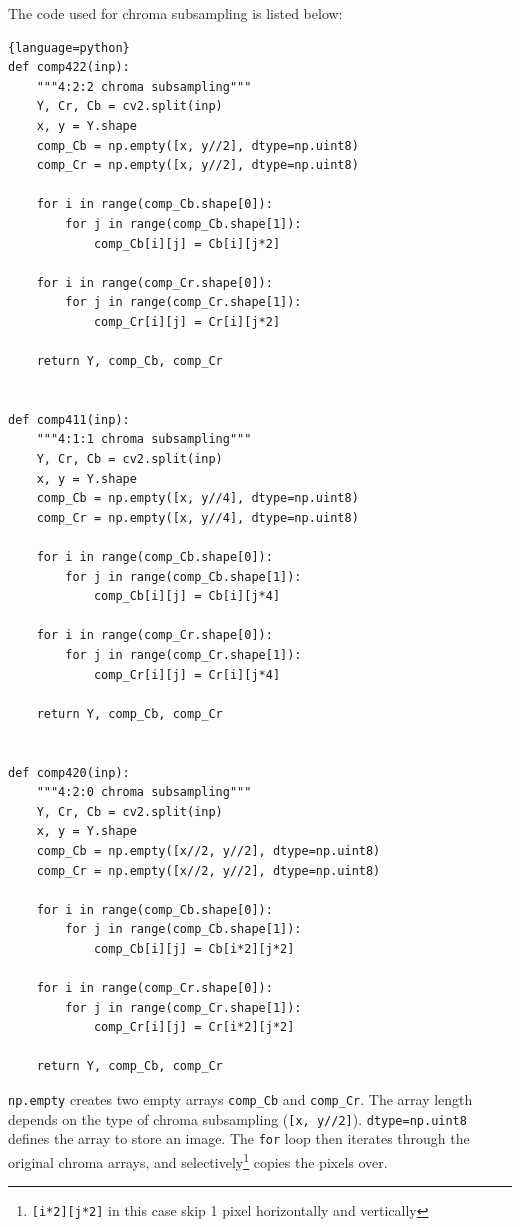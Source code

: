 \documentclass{article}
\begin{document}
The code used for chroma subsampling is listed below:
\begin{lstlisting}{language=python}
def comp422(inp):
    """4:2:2 chroma subsampling"""
    Y, Cr, Cb = cv2.split(inp)
    x, y = Y.shape
    comp_Cb = np.empty([x, y//2], dtype=np.uint8)
    comp_Cr = np.empty([x, y//2], dtype=np.uint8)

    for i in range(comp_Cb.shape[0]):
        for j in range(comp_Cb.shape[1]):
            comp_Cb[i][j] = Cb[i][j*2]

    for i in range(comp_Cr.shape[0]):
        for j in range(comp_Cr.shape[1]):
            comp_Cr[i][j] = Cr[i][j*2]

    return Y, comp_Cb, comp_Cr


def comp411(inp):
    """4:1:1 chroma subsampling"""
    Y, Cr, Cb = cv2.split(inp)
    x, y = Y.shape
    comp_Cb = np.empty([x, y//4], dtype=np.uint8)
    comp_Cr = np.empty([x, y//4], dtype=np.uint8)

    for i in range(comp_Cb.shape[0]):
        for j in range(comp_Cb.shape[1]):
            comp_Cb[i][j] = Cb[i][j*4]

    for i in range(comp_Cr.shape[0]):
        for j in range(comp_Cr.shape[1]):
            comp_Cr[i][j] = Cr[i][j*4]

    return Y, comp_Cb, comp_Cr


def comp420(inp):
    """4:2:0 chroma subsampling"""
    Y, Cr, Cb = cv2.split(inp)
    x, y = Y.shape
    comp_Cb = np.empty([x//2, y//2], dtype=np.uint8)
    comp_Cr = np.empty([x//2, y//2], dtype=np.uint8)

    for i in range(comp_Cb.shape[0]):
        for j in range(comp_Cb.shape[1]):
            comp_Cb[i][j] = Cb[i*2][j*2]

    for i in range(comp_Cr.shape[0]):
        for j in range(comp_Cr.shape[1]):
            comp_Cr[i][j] = Cr[i*2][j*2]

    return Y, comp_Cb, comp_Cr
\end{lstlisting}

\texttt{np.empty} creates two empty arrays \texttt{comp\_Cb} and \texttt{comp\_Cr}.
The array length depends on the type of chroma subsampling (\texttt{[x, y//2]}).
\texttt{dtype=np.uint8} defines the array to store an image.
The \texttt{for} loop then iterates through the original chroma arrays, and selectively\footnote{\texttt{[i*2][j*2]} in this case skip 1 pixel horizontally and vertically} copies the pixels over.
\end{document}
